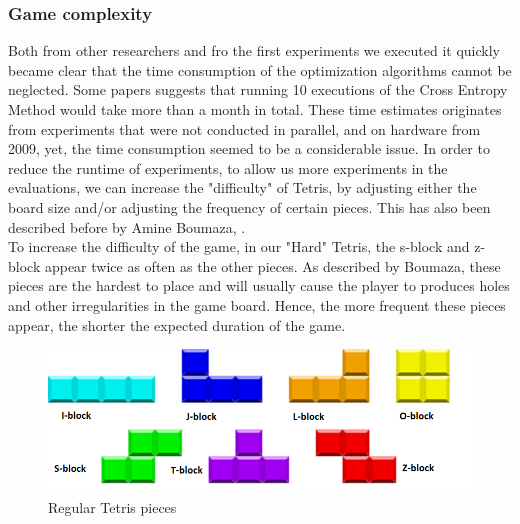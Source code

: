 \subsubsection{Game complexity \label{HardTetris}}
Both from other researchers and fro the first experiments we executed it quickly became clear
that the time consumption of the optimization algorithms cannot be neglected.
Some papers suggests that running 10 executions of the Cross Entropy Method
would take more than a month in total. These time estimates 
originates from experiments that were not conducted in parallel,
and on hardware from 2009, yet, the time consumption seemed to 
be a considerable issue.
In order to reduce the runtime of experiments, 
to allow us more experiments in the evaluations, 
we can increase the "difficulty" of Tetris, by 
adjusting either the board size and/or adjusting the 
frequency of certain pieces. This has also been described 
before by Amine Boumaza, \citep{boumaza2009}.\\
To increase the difficulty of the game,
in our "Hard" Tetris, the s-block and z-block appear twice as often 
as the other pieces. As described by Boumaza, these pieces are the hardest to
place and will usually cause the player to produces holes and other irregularities
in the game board. Hence, the more frequent these pieces appear, the 
shorter the expected duration of the game.

\begin{figure}[H]
\begin{center}
\includegraphics[scale=0.6]{img/Pieces}
\end{center}
\caption{Regular Tetris pieces \label{fig:TetrisPieces}}
\end{figure}

